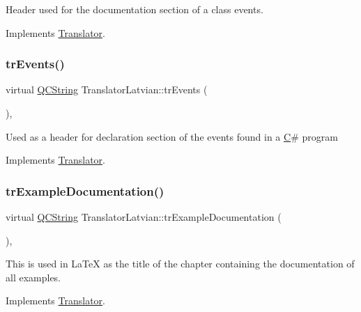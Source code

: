 Header used for the documentation section of a class\textquotesingle{} events. 

Implements \mbox{\hyperlink{class_translator}{Translator}}.

\mbox{\label{class_translator_latvian_a68994faaf7f8921a0f314911ddb88a42}} 
\subsubsection{\texorpdfstring{trEvents()}{trEvents()}}
{\footnotesize\ttfamily virtual \mbox{\hyperlink{class_q_c_string}{Q\+C\+String}} Translator\+Latvian\+::tr\+Events (\begin{DoxyParamCaption}{ }\end{DoxyParamCaption})\hspace{0.3cm}{\ttfamily [inline]}, {\ttfamily [virtual]}}

Used as a header for declaration section of the events found in a \mbox{\hyperlink{class_c}{C}}\# program 

Implements \mbox{\hyperlink{class_translator}{Translator}}.

\mbox{\label{class_translator_latvian_a641b538c690d3574673976b7eed5a173}} 
\subsubsection{\texorpdfstring{trExampleDocumentation()}{trExampleDocumentation()}}
{\footnotesize\ttfamily virtual \mbox{\hyperlink{class_q_c_string}{Q\+C\+String}} Translator\+Latvian\+::tr\+Example\+Documentation (\begin{DoxyParamCaption}{ }\end{DoxyParamCaption})\hspace{0.3cm}{\ttfamily [inline]}, {\ttfamily [virtual]}}

This is used in La\+TeX as the title of the chapter containing the documentation of all examples. 

Implements \mbox{\hyperlink{class_translator}{Translator}}.

\mbox{\label{class_translator_latvian_a6a64f9108b45b2dfaf2df0907acfca5c}} 
